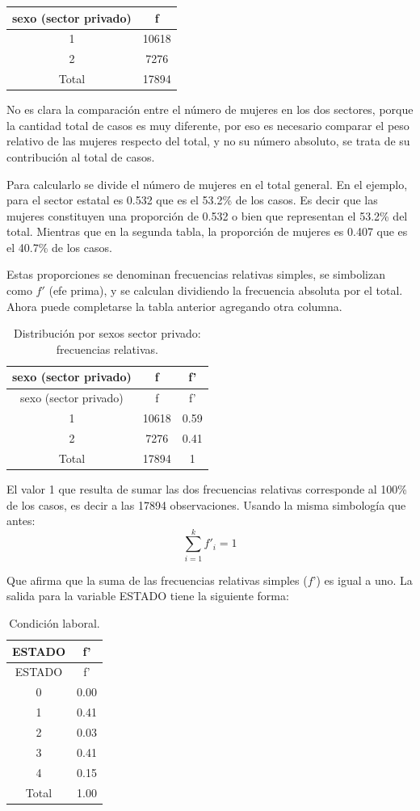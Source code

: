 \documentclass[]{book}
\begin{document}
\begin{longtable}[]{@{}cc@{}}
\toprule
sexo (sector privado) & f\tabularnewline
\midrule
\endhead
1 & 10618\tabularnewline
2 & 7276\tabularnewline
Total & 17894\tabularnewline
\bottomrule
\end{longtable}

No es clara la comparación entre el número de mujeres en los dos sectores, porque la cantidad total de casos es muy diferente, por eso es necesario comparar el peso relativo de las mujeres respecto del total, y no su número absoluto, se trata de su contribución al total de casos.

Para calcularlo se divide el número de mujeres en el total general. En el ejemplo, para el sector estatal es 0.532 que es el 53.2\% de los casos. Es decir que las mujeres constituyen una proporción de 0.532 o bien que representan el 53.2\% del total. Mientras que en la segunda tabla, la proporción de mujeres es 0.407 que es el 40.7\% de los casos.

Estas proporciones se denominan frecuencias relativas simples, se simbolizan como \(f'\) (efe prima), y se calculan dividiendo la frecuencia absoluta por el total. Ahora puede completarse la tabla anterior agregando otra columna.

\begin{longtable}[]{@{}ccc@{}}
\caption{\label{tab:unnamed-chunk-23}Distribución por sexos sector privado: frecuencias relativas.}\tabularnewline
\toprule
sexo (sector privado) & f & f'\tabularnewline
\midrule
\endfirsthead
\toprule
sexo (sector privado) & f & f'\tabularnewline
\midrule
\endhead
1 & 10618 & 0.59\tabularnewline
2 & 7276 & 0.41\tabularnewline
Total & 17894 & 1\tabularnewline
\bottomrule
\end{longtable}

El valor 1 que resulta de sumar las dos frecuencias relativas corresponde al 100\% de los casos, es decir a las 17894 observaciones. Usando la misma simbología que antes: \[\sum_{i=1}^{k} f'_i =1\]

Que afirma que la suma de las frecuencias relativas simples (\(f’\)) es igual a uno.
La salida para la variable ESTADO tiene la siguiente forma:

\begin{longtable}[]{@{}cc@{}}
\caption{\label{tab:unnamed-chunk-24}Condición laboral.}\tabularnewline
\toprule
ESTADO & f'\tabularnewline
\midrule
\endfirsthead
\toprule
ESTADO & f'\tabularnewline
\midrule
\endhead
0 & 0.00\tabularnewline
1 & 0.41\tabularnewline
2 & 0.03\tabularnewline
3 & 0.41\tabularnewline
4 & 0.15\tabularnewline
Total & 1.00\tabularnewline
\bottomrule
\end{longtable}
\end{document}
